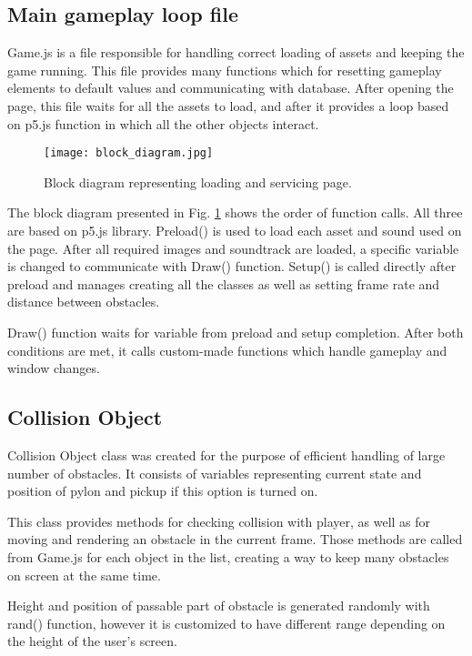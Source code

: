 \documentclass[oneside,a4paper,11pt]{report}
\begin{document}
\subsection{Main gameplay loop file}
Game.js is a file responsible for handling correct loading of assets and keeping the game running. This file provides many functions which for resetting gameplay elements to default values and communicating with database. After opening the page, this file waits for all the assets to load, and after it provides a loop based on p5.js function in which all the other objects interact.

\begin{figure}
	\centering
	\texttt{[image: block\_diagram.jpg]}
	\caption{Block diagram representing loading and servicing page.\label{fig:block_diagram}}
\end{figure}
	
\par
The block diagram presented in Fig. \ref{fig:block_diagram} shows the order of function calls. All three are based on p5.js library. Preload() is used to load each asset and sound used on the page. After all required images and soundtrack are loaded, a specific variable is changed to communicate with Draw() function. Setup() is called directly after preload and manages creating all the classes as well as setting frame rate and distance between obstacles. 

\par
Draw() function waits for variable from preload and setup completion. After both conditions are met, it calls custom-made functions which handle gameplay and window changes.

\subsection{Collision Object}
Collision Object class was created for the purpose of efficient handling of large number of obstacles. It consists of variables representing current state and position of pylon and pickup if this option is turned on.

\par
This class provides methods for checking collision with player, as well as for moving and rendering an obstacle in the current frame. Those methods are called from Game.js for each object in the list, creating a way to keep many obstacles on screen at the same time.

\par
Height and position of passable part of obstacle is generated randomly with rand() function, however it is customized to have different range depending on the height of the user's screen.
\end{document}
